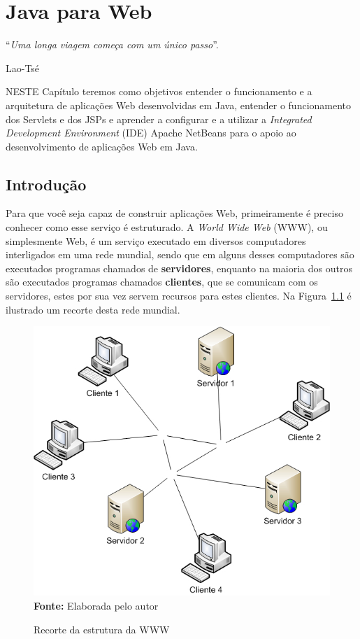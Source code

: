 \chapter{Java para Web}
\epigraph{``\textit{Uma longa viagem começa com um único passo}''.}{Lao-Tsé}

\lettrine[lines=4, lhang=0.1, lraise=0, loversize=0.2, findent=0.1em]{\textcolor{corAzulTema}{N}}{ESTE} Capítulo teremos como objetivos entender o funcionamento e a arquitetura de aplicações Web desenvolvidas em Java, entender o funcionamento dos Servlets e dos JSPs e aprender a configurar e a utilizar a \textit{Integrated Development Environment} (IDE) Apache NetBeans para o apoio ao desenvolvimento de aplicações Web em Java.


\section{Introdução}

Para que você seja capaz de construir aplicações Web, primeiramente é preciso conhecer como esse serviço é estruturado. A \textit{World Wide Web} (WWW), ou simplesmente Web, é um serviço executado em diversos computadores interligados em uma rede mundial, sendo que em alguns desses computadores são executados programas chamados de \textbf{servidores}, enquanto na maioria dos outros são executados programas chamados \textbf{clientes}, que se comunicam com os servidores, estes por sua vez servem recursos para estes clientes. Na Figura~\ref{fig:cap01ClienteServidor} é ilustrado um recorte desta rede mundial.

\FloatBarrier
\begin{figure}[!htbp]
    \centering
    \caption{Recorte da estrutura da WWW}
    \includegraphics[scale=0.6]{imagens/cap01ClienteServidor}
    \\\textbf{Fonte:} Elaborada pelo autor
    \label{fig:cap01ClienteServidor}
\end{figure}
\FloatBarrier

